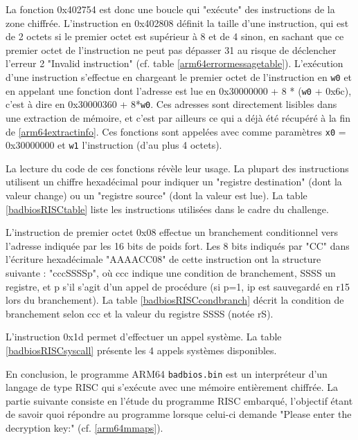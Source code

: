 \documentclass[a4paper,10pt]{article}
\begin{document}
La fonction 0x402754 est donc une boucle qui "exécute" des instructions de la zone chiffrée. L'instruction en 0x402808 définit la taille d'une instruction, qui est de 2 octets si le premier octet est supérieur à 8 et de 4 sinon, en sachant que ce premier octet de l'instruction ne peut pas dépasser 31 au risque de déclencher l'erreur 2 "Invalid instruction" (cf. table \ref{arm64errormessagetable}). L'exécution d'une instruction s'effectue en chargeant le premier octet de l'instruction en \texttt{w0} et en appelant une fonction dont l'adresse est lue en 0x30000000 + 8 * (\texttt{w0} + 0x6c), c'est à dire en 0x30000360 + 8*\texttt{w0}. Ces adresses sont directement lisibles dans une extraction de mémoire, et c'est par ailleurs ce qui a déjà été récupéré à la fin de \ref{arm64extractinfo}. Ces fonctions sont appelées avec comme paramètres \texttt{x0} = 0x30000000 et \texttt{w1} l'instruction (d'au plus 4 octets).

La lecture du code de ces fonctions révèle leur usage. La plupart des instructions utilisent un chiffre hexadécimal pour indiquer un "registre destination" (dont la valeur change) ou un "registre source" (dont la valeur est lue). La table \ref{badbiosRISCtable} liste les instructions utilisées dans le cadre du challenge.

L'instruction de premier octet 0x08 effectue un branchement conditionnel vers l'adresse indiquée par les 16 bits de poids fort. Les 8 bits indiqués par "CC" dans l'écriture hexadécimale "AAAACC08" de cette instruction ont la structure suivante : "cccSSSSp", où ccc indique une condition de branchement, SSSS un registre, et p s'il s'agit d'un appel de procédure (si p=1, ip est sauvegardé en r15 lors du branchement). La table \ref{badbiosRISCcondbranch} décrit la condition de branchement selon ccc et la valeur du registre SSSS (notée rS).

L'instruction 0x1d permet d'effectuer un appel système. La table \ref{badbiosRISCsyscall} présente les 4 appels systèmes disponibles.

En conclusion, le programme ARM64 \texttt{badbios.bin} est un interpréteur d'un langage de type RISC qui s'exécute avec une mémoire entièrement chiffrée. La partie suivante consiste en l'étude du programme RISC embarqué, l'objectif étant de savoir quoi répondre au programme lorsque celui-ci demande "Please enter the decryption key:" (cf. \ref{arm64mmaps}).
\end{document}
